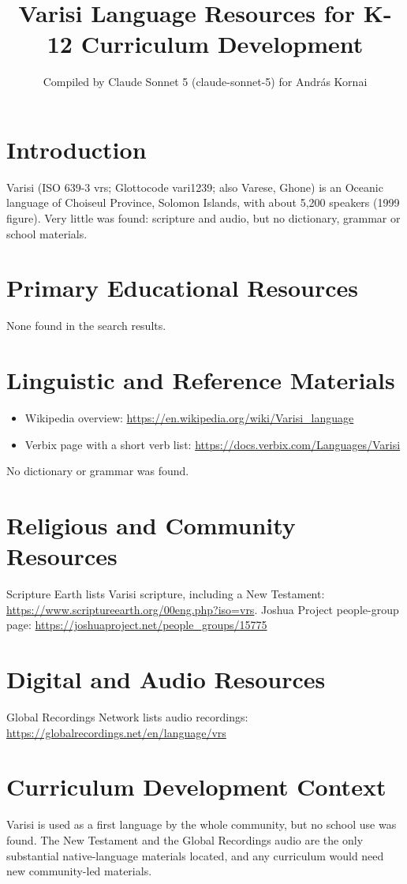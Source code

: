 \documentclass[12pt]{article}
\title{Varisi Language Resources for K-12 Curriculum Development}
\author{Compiled by Claude Sonnet 5 (claude-sonnet-5) for Andr\'as Kornai}
\date{}
\begin{document}
\maketitle
\section{Introduction}
Varisi (ISO 639-3 vrs; Glottocode vari1239; also Varese, Ghone) is an Oceanic language of Choiseul Province, Solomon Islands, with about 5,200 speakers (1999 figure). Very little was found: scripture and audio, but no dictionary, grammar or school materials.
\section{Primary Educational Resources}
None found in the search results.
\section{Linguistic and Reference Materials}
\begin{itemize}
\item Wikipedia overview: \url{https://en.wikipedia.org/wiki/Varisi_language}
\item Verbix page with a short verb list: \url{https://docs.verbix.com/Languages/Varisi}
\end{itemize}
No dictionary or grammar was found.
\section{Religious and Community Resources}
Scripture Earth lists Varisi scripture, including a New Testament: \url{https://www.scriptureearth.org/00eng.php?iso=vrs}. Joshua Project people-group page: \url{https://joshuaproject.net/people_groups/15775}
\section{Digital and Audio Resources}
Global Recordings Network lists audio recordings: \url{https://globalrecordings.net/en/language/vrs}
\section{Curriculum Development Context}
Varisi is used as a first language by the whole community, but no school use was found. The New Testament and the Global Recordings audio are the only substantial native-language materials located, and any curriculum would need new community-led materials.
\end{document}
